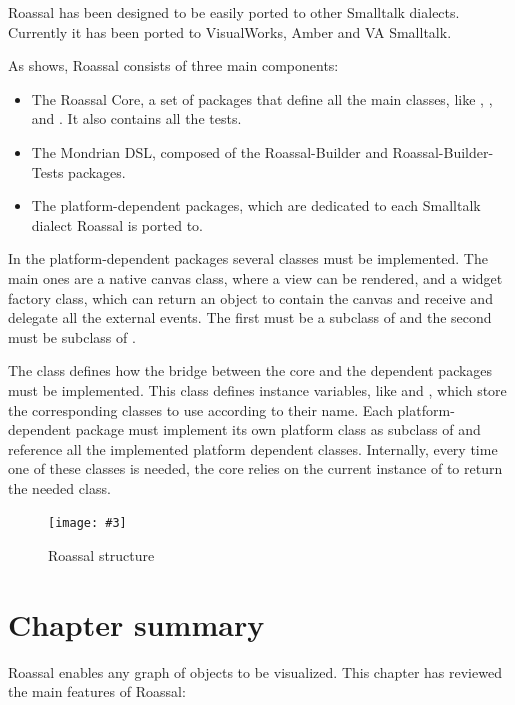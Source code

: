 \documentclass[a4paper,10pt,twoside]{book}
\newcommand{\fig}[4]{
		\begin{figure}[#1]
			\centering
			\texttt{[image: \#3]}
			\caption{\label{fig:#3}#4}
		\end{figure}}
\begin{document}
Roassal has been designed to be easily ported to other Smalltalk dialects. Currently it has been ported to VisualWorks, Amber and VA Smalltalk.

As  shows, Roassal consists of three main components:

\begin{itemize}
\item  The Roassal Core, a set of packages that define all the main classes, like , ,  and . It also contains all the tests.
\item The Mondrian DSL, composed of the Roassal-Builder and Roassal-Builder-Tests packages.
\item The platform-dependent packages, which are dedicated to each Smalltalk dialect Roassal is ported to.
\end{itemize} 


In the platform-dependent packages several classes must be implemented. The main ones are a native canvas class, where a view can be rendered, and a widget factory class, which can return an object to contain the canvas and receive and delegate all the external events.
The first must be a subclass of  and the second must be subclass of .

The  class defines how the bridge between the core and the dependent packages must be implemented. This class defines instance variables, like  and , which store the corresponding classes to use according to their name. Each platform-dependent package must implement its own platform class as subclass of  and reference all the implemented platform dependent classes.
Internally, every time one of these classes is needed, the core relies on the current instance of  to return the needed class.

\fig{H}{0.3}{structure}{Roassal structure}


\section{Chapter summary}

Roassal enables any graph of objects to be visualized. This chapter has reviewed the main features of Roassal:
\end{document}
